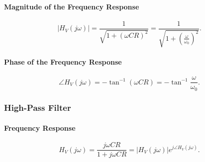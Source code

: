 \begin{symbols}
\end{symbols}

\paragraph{Magnitude of the Frequency Response}
\begin{equation*}
  \left| H_V(j\omega) \right| = \frac{1}{\sqrt{1 + \left( \omega CR \right)^2}} = \frac{1}{\sqrt{1 + \left( \frac{\omega}{\omega_0} \right)^2}}
.\end{equation*}

\begin{symbols}
\end{symbols}

\paragraph{Phase of the Frequency Response}
\begin{equation*}
  \angle H_V(j\omega) = - \tan^{-1} \left( \omega CR \right) = - \tan^{-1} \frac{\omega}{\omega_0}
.\end{equation*}

\begin{symbols}
\end{symbols}


\subsubsection{High-Pass Filter}

\paragraph{Frequency Response}
\begin{equation*}
  H_V( j \omega) = \frac{j \omega CR}{1 + j \omega CR} = \left| H_V ( j \omega) \right| e^{j \angle H_V(j \omega)}
.\end{equation*}

\begin{symbols}
\end{symbols}

